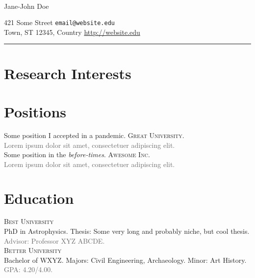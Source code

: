 \documentclass[12pt]{article}
\newcommand{\smallitem}[1]{\small\textcolor{dimgray}{#1}}
\begin{document}

\begin{flushleft}
\hfill{\updateinfo} \\

{\centering \huge Jane-John Doe\par}

421 Some Street \hfill \texttt{email@website.edu} \\

Town, ST 12345, Country \hfill \url{http://website.edu}
\end{flushleft}
{\centering\rule{\textwidth}{1pt}\par}

\section{Research Interests}
\lipsum[75]


\section{Positions}
Some position I accepted in a pandemic. \textsc{Great University}. \\
\smallitem{Lorem ipsum dolor sit amet, consectetuer adipiscing elit.}\\

Some position in the \textit{before-times}. \textsc{Awesome Inc.} \\
\smallitem{Lorem ipsum dolor sit amet, consectetuer adipiscing elit.}

\section{Education}
\textsc{Best University} \\ 
PhD in Astrophysics. Thesis: Some very long and probably niche, but cool thesis.\\
\smallitem{Advisor: Professor XYZ ABCDE.}\\

\textsc{Better University} \\
Bachelor of WXYZ. Majors: Civil Engineering, Archaeology. Minor: Art History.\\
\smallitem{GPA: 4.20/4.00.}
\end{document}
